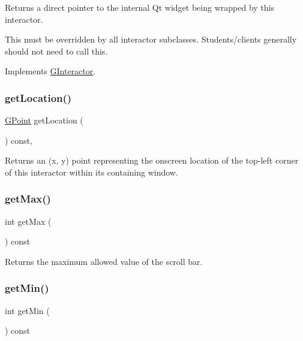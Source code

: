 Returns a direct pointer to the internal Qt widget being wrapped by this interactor. 

This must be overridden by all interactor subclasses. Students/clients generally should not need to call this. 

Implements \mbox{\hyperlink{classGInteractor}{G\+Interactor}}.

\mbox{\label{classGInteractor_a4f83802015511edeb63b892830812c11}} 
\subsubsection{\texorpdfstring{get\+Location()}{getLocation()}}
{\footnotesize\ttfamily \mbox{\hyperlink{structGPoint}{G\+Point}} get\+Location (\begin{DoxyParamCaption}{ }\end{DoxyParamCaption}) const\hspace{0.3cm}{\ttfamily [virtual]}, {\ttfamily [inherited]}}



Returns an (x, y) point representing the onscreen location of the top-\/left corner of this interactor within its containing window. 

\mbox{\label{classGScrollBar_acc49776af85220307b8955d752d9ffcb}} 
\subsubsection{\texorpdfstring{get\+Max()}{getMax()}}
{\footnotesize\ttfamily int get\+Max (\begin{DoxyParamCaption}{ }\end{DoxyParamCaption}) const\hspace{0.3cm}{\ttfamily [virtual]}}



Returns the maximum allowed value of the scroll bar. 

\mbox{\label{classGScrollBar_ad06537e69f71666d30bec18dc042a6e4}} 
\subsubsection{\texorpdfstring{get\+Min()}{getMin()}}
{\footnotesize\ttfamily int get\+Min (\begin{DoxyParamCaption}{ }\end{DoxyParamCaption}) const\hspace{0.3cm}{\ttfamily [virtual]}}



